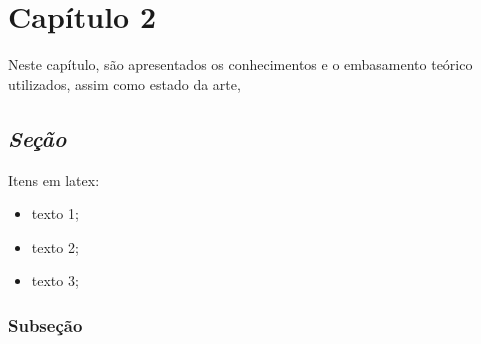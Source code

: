 \chapter[Capítulo 2]{Capítulo 2}
\label{ch:cap2}

Neste capítulo, são apresentados os conhecimentos e o embasamento teórico utilizados, assim como estado da arte, 

\section[\textit{Seção}]{\textit{Seção}}
\lipsum[1-1]

Itens em latex:
\begin{itemize}
	\item texto 1;
	\item texto 2;
	\item texto 3;
\end{itemize}

\lipsum[2-3]

\subsection{Subseção}

\lipsum[2-4]